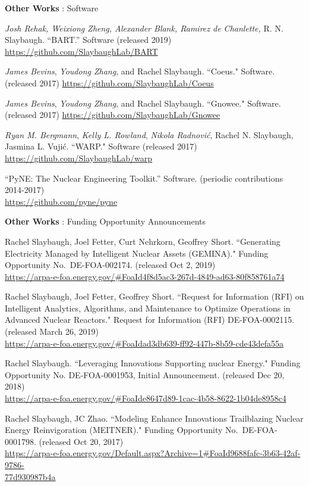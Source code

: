 \begin{bibsection}
\item \textbf{Other Works} : Software
\item \textit{Josh Rehak, Weixiong Zheng, Alexander Blank, Ramirez de Chanlette,} R. N. Slaybaugh. “BART.” Software (released 2019) \\
\url{https://github.com/SlaybaughLab/BART}

\item \textit{James Bevins}, \textit{Youdong Zhang}, and Rachel Slaybaugh. ``Coeus." Software. (released 2017) \url{https://github.com/SlaybaughLab/Coeus} 

\item \textit{James Bevins}, \textit{Youdong Zhang}, and Rachel Slaybaugh. ``Gnowee." Software. (released 2017) \url{https://github.com/SlaybaughLab/Gnowee} 

\item \textit{Ryan M. Bergmann}, \textit{Kelly L. Rowland}, \textit{Nikola Radnovi\'c}, Rachel N. Slaybaugh, Jasmina L. Vuji\'c. ``WARP." Software (released 2017) \url{https://github.com/SlaybaughLab/warp}

\item “PyNE: The Nuclear Engineering Toolkit.” Software. (periodic contributions 2014-2017) \\
\url{https://github.com/pyne/pyne}

\item \textbf{Other Works} : Funding Opportunity Announcements
\item Rachel Slaybaugh, Joel Fetter, Curt Nehrkorn, Geoffrey Short. ``Generating Electricity Managed by Intelligent Nuclear
Assets (GEMINA)." Funding Opportunity No.\ DE-FOA-002174. (released Oct 2, 2019)\\
\url{https://arpa-e-foa.energy.gov/#FoaId4f8d5ac3-267d-4849-ad63-80f858761a74}

\item Rachel Slaybaugh, Joel Fetter, Geoffrey Short. ``Request for Information (RFI) on Intelligent Analytics, Algorithms, and Maintenance to Optimize Operations in Advanced Nuclear Reactors." Request for Information (RFI) DE-FOA-0002115. (released March 26, 2019)\\
\url{https://arpa-e-foa.energy.gov/#FoaIdad3db639-ff92-447b-8b59-cde43defa55a}

\item Rachel Slaybaugh. ``Leveraging Innovations Supporting nuclear Energy." Funding Opportunity No. DE-FOA-0001953, Initial Announcement. (released Dec 20, 2018)\\
\url{https://arpa-e-foa.energy.gov/#FoaIde8647d89-1cac-4b58-8622-1b04de8958c4}

\item Rachel Slaybaugh, JC Zhao. ``Modeling Enhance Innovations Trailblazing Nuclear Energy Reinvigoration (MEITNER)." Funding Opportunity No.\ DE-FOA-0001798. (released Oct 20, 2017)\\
\url{https://arpa-e-foa.energy.gov/Default.aspx?Archive=1#FoaId9688fafc-3b63-42af-9786-}\\ \url{77d930987b4a}

\end{bibsection}

